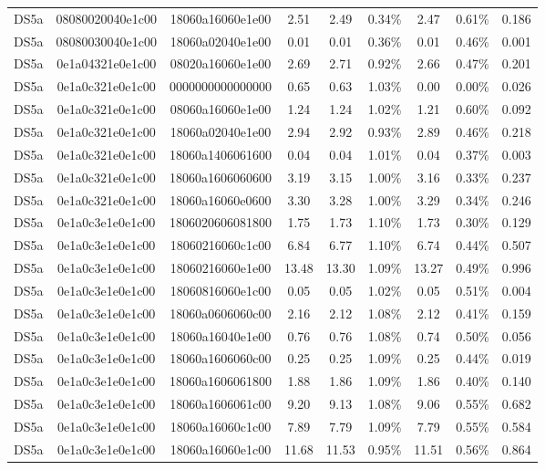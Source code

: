 \begin{tabular}{|c|c c|c|c c|c c|c|}
  DS5a & 08080020040e1c00 & 18060a16060e1e00 & 2.51 & 2.49 & 0.34\% & 2.47 & 0.61\% & 0.186 \\
  DS5a & 08080030040e1c00 & 18060a02040e1e00 & 0.01 & 0.01 & 0.36\% & 0.01 & 0.46\% & 0.001 \\
  DS5a & 0e1a04321e0e1c00 & 08020a16060e1e00 & 2.69 & 2.71 & 0.92\% & 2.66 & 0.47\% & 0.201 \\
  DS5a & 0e1a0c321e0e1c00 & 0000000000000000 & 0.65 & 0.63 & 1.03\% & 0.00 & 0.00\% & 0.026 \\
  DS5a & 0e1a0c321e0e1c00 & 08060a16060e1e00 & 1.24 & 1.24 & 1.02\% & 1.21 & 0.60\% & 0.092 \\
  DS5a & 0e1a0c321e0e1c00 & 18060a02040e1e00 & 2.94 & 2.92 & 0.93\% & 2.89 & 0.46\% & 0.218 \\
  DS5a & 0e1a0c321e0e1c00 & 18060a1406061600 & 0.04 & 0.04 & 1.01\% & 0.04 & 0.37\% & 0.003 \\
  DS5a & 0e1a0c321e0e1c00 & 18060a1606060600 & 3.19 & 3.15 & 1.00\% & 3.16 & 0.33\% & 0.237 \\
  DS5a & 0e1a0c321e0e1c00 & 18060a16060e0600 & 3.30 & 3.28 & 1.00\% & 3.29 & 0.34\% & 0.246 \\
  DS5a & 0e1a0c3e1e0e1c00 & 1806020606081800 & 1.75 & 1.73 & 1.10\% & 1.73 & 0.30\% & 0.129 \\
  DS5a & 0e1a0c3e1e0e1c00 & 18060216060c1c00 & 6.84 & 6.77 & 1.10\% & 6.74 & 0.44\% & 0.507 \\
  DS5a & 0e1a0c3e1e0e1c00 & 18060216060e1e00 & 13.48 & 13.30 & 1.09\% & 13.27 & 0.49\% & 0.996 \\
  DS5a & 0e1a0c3e1e0e1c00 & 18060816060e1c00 & 0.05 & 0.05 & 1.02\% & 0.05 & 0.51\% & 0.004 \\
  DS5a & 0e1a0c3e1e0e1c00 & 18060a0606060c00 & 2.16 & 2.12 & 1.08\% & 2.12 & 0.41\% & 0.159 \\
  DS5a & 0e1a0c3e1e0e1c00 & 18060a16040e1e00 & 0.76 & 0.76 & 1.08\% & 0.74 & 0.50\% & 0.056 \\
  DS5a & 0e1a0c3e1e0e1c00 & 18060a1606060c00 & 0.25 & 0.25 & 1.09\% & 0.25 & 0.44\% & 0.019 \\
  DS5a & 0e1a0c3e1e0e1c00 & 18060a1606061800 & 1.88 & 1.86 & 1.09\% & 1.86 & 0.40\% & 0.140 \\
  DS5a & 0e1a0c3e1e0e1c00 & 18060a1606061c00 & 9.20 & 9.13 & 1.08\% & 9.06 & 0.55\% & 0.682 \\
  DS5a & 0e1a0c3e1e0e1c00 & 18060a16060c1c00 & 7.89 & 7.79 & 1.09\% & 7.79 & 0.55\% & 0.584 \\
  DS5a & 0e1a0c3e1e0e1c00 & 18060a16060e1c00 & 11.68 & 11.53 & 0.95\% & 11.51 & 0.56\% & 0.864 \\

\end{tabular}
